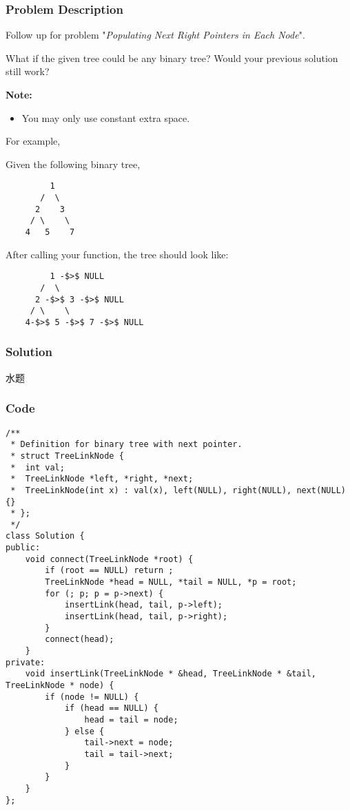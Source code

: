 \documentclass[courier]{article}
\begin{document}
\begin{CJK*}{UTF8}{gkai}
\subsubsection*{Problem Description}
Follow up for problem "\emph{Populating Next Right Pointers in Each Node}".

What if the given tree could be any binary tree? Would your previous solution still work?

\textbf{Note:}

\begin{itemize}
\item You may only use constant extra space.
\end{itemize}

For example,


Given the following binary tree,


\begin{verbatim}
         1
       /  \
      2    3
     / \    \
    4   5    7
\end{verbatim}

After calling your function, the tree should look like:


\begin{verbatim}
         1 -$>$ NULL
       /  \
      2 -$>$ 3 -$>$ NULL
     / \    \
    4-$>$ 5 -$>$ 7 -$>$ NULL
\end{verbatim}



\subsubsection*{Solution}
水题

\subsubsection*{Code}
\begin{lstlisting}
/**
 * Definition for binary tree with next pointer.
 * struct TreeLinkNode {
 *  int val;
 *  TreeLinkNode *left, *right, *next;
 *  TreeLinkNode(int x) : val(x), left(NULL), right(NULL), next(NULL) {}
 * };
 */
class Solution {
public:
    void connect(TreeLinkNode *root) {
        if (root == NULL) return ;
        TreeLinkNode *head = NULL, *tail = NULL, *p = root;
        for (; p; p = p->next) {
            insertLink(head, tail, p->left);
            insertLink(head, tail, p->right);
        }
        connect(head);
    }
private:
    void insertLink(TreeLinkNode * &head, TreeLinkNode * &tail, TreeLinkNode * node) {
        if (node != NULL) {
            if (head == NULL) {
                head = tail = node;
            } else {
                tail->next = node;
                tail = tail->next;
            }
        }
    }
};


\end{lstlisting}
\end{CJK*}
\end{document}
